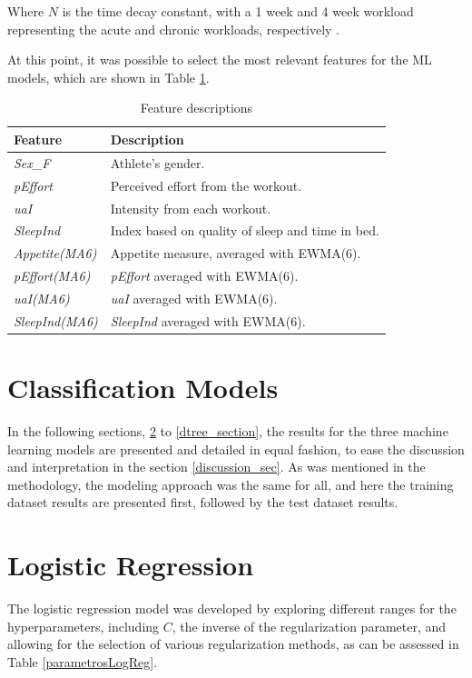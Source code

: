 \documentclass[conference]{IEEEtran}
\begin{document}
Where $N$ is the time decay constant, with a 1 week and 4 week workload representing the acute and chronic workloads, respectively \cite{Murray16}.

At this point, it was possible to select the most relevant features for the ML models, which are shown in Table \ref{features_selection}.

\begin{table}[H]
\centering
\caption{Feature descriptions}
\label{features_selection}
\begin{tabular}{ll}
\toprule
\textbf{Feature} & \textbf{Description} \\
\midrule
\textit{Sex\_F} & Athlete's gender.  \\
\textit{pEffort} & Perceived effort from the workout. \\
\textit{uaI} & Intensity from each workout. \\
\textit{SleepInd} & Index based on quality of sleep and time in bed. \\
\textit{Appetite(MA6)} & Appetite measure, averaged with EWMA(6). \\
\textit{pEffort(MA6)} & \textit{pEffort} averaged with EWMA(6). \\
\textit{uaI(MA6)} & \textit{uaI} averaged with EWMA(6). \\
\textit{SleepInd(MA6)} & \textit{SleepInd} averaged with EWMA(6). \\
\bottomrule
\end{tabular}
\end{table}


\section{Classification Models}

In the following sections, \ref{logreg_section} to \ref{dtree_section}, the results for the three machine learning models are presented and detailed in equal fashion, to ease the discussion and interpretation in the section \ref{discussion_sec}. As was mentioned in the methodology, the modeling approach was the same for all, and here the training dataset results are presented first, followed by the test dataset results.

\section{Logistic Regression} \label{logreg_section}

The logistic regression model was developed by exploring different ranges for the hyperparameters, including $C$, the inverse of the regularization parameter, and allowing for the selection of various regularization methods, as can be assessed in Table \ref{parametrosLogReg}.
\end{document}
